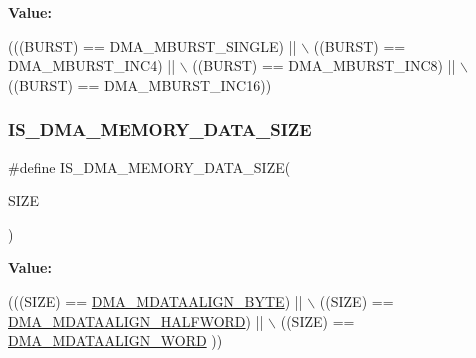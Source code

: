 {\bfseries Value\+:}
\begin{DoxyCode}
(((BURST) == DMA\_MBURST\_SINGLE) || \(\backslash\)
                                    ((BURST) == DMA\_MBURST\_INC4)   || \(\backslash\)
                                    ((BURST) == DMA\_MBURST\_INC8)   || \(\backslash\)
                                    ((BURST) == DMA\_MBURST\_INC16))
\end{DoxyCode}
\mbox{\label{group___d_m_a___private___macros_gac9e3748cebcb16d4ae4206d562bc804c}} 
\subsubsection{\texorpdfstring{I\+S\+\_\+\+D\+M\+A\+\_\+\+M\+E\+M\+O\+R\+Y\+\_\+\+D\+A\+T\+A\+\_\+\+S\+I\+ZE}{IS\_DMA\_MEMORY\_DATA\_SIZE}}
{\footnotesize\ttfamily \#define I\+S\+\_\+\+D\+M\+A\+\_\+\+M\+E\+M\+O\+R\+Y\+\_\+\+D\+A\+T\+A\+\_\+\+S\+I\+ZE(\begin{DoxyParamCaption}\item[{}]{S\+I\+ZE }\end{DoxyParamCaption})}

{\bfseries Value\+:}
\begin{DoxyCode}
(((SIZE) == \mbox{\hyperlink{group___d_m_a___memory__data__size_ga9ed07bddf736298eba11508382ea4d51}{DMA\_MDATAALIGN\_BYTE}})     || \(\backslash\)
                                       ((SIZE) == \mbox{\hyperlink{group___d_m_a___memory__data__size_ga2c7355971c0da34a7ffe50ec87403071}{DMA\_MDATAALIGN\_HALFWORD}}) || \(\backslash\)
                                       ((SIZE) == \mbox{\hyperlink{group___d_m_a___memory__data__size_ga8812da819f18c873249074f3920220b2}{DMA\_MDATAALIGN\_WORD}} ))
\end{DoxyCode}
\mbox{\label{group___d_m_a___private___macros_gaa880f39d499d1e80449cf80381e4eb67}} 
